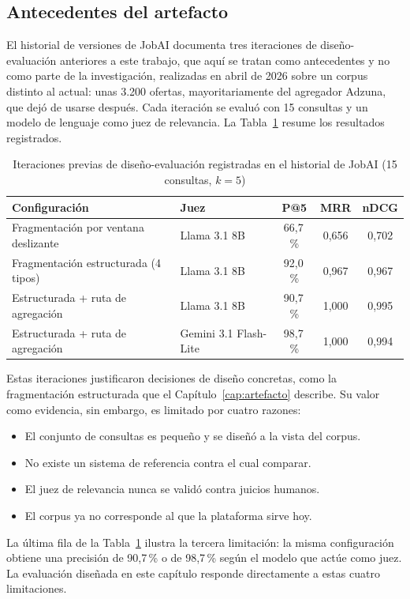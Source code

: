 \subsection{Antecedentes del artefacto}
\label{sec:met-ciclos-previos}

El historial de versiones de JobAI documenta tres iteraciones de diseño-evaluación anteriores a este trabajo, que aquí se tratan como antecedentes y no como parte de la investigación, realizadas en abril de 2026 sobre un corpus distinto al actual: unas 3.200 ofertas, mayoritariamente del agregador Adzuna, que dejó de usarse después. Cada iteración se evaluó con 15 consultas y un modelo de lenguaje como juez de relevancia. La Tabla~\ref{tab:met-iteraciones} resume los resultados registrados.

\begin{table}[htbp!]
    \centering
    \caption{Iteraciones previas de diseño-evaluación registradas en el historial de JobAI (15 consultas, $k=5$)}
    \label{tab:met-iteraciones}
    \begin{tabular}{|p{6.2cm}|p{2.6cm}|c|c|c|}
        \hline
        \textbf{Configuración} & \textbf{Juez} & \textbf{P@5} & \textbf{MRR} & \textbf{nDCG} \\
        \hline
        Fragmentación por ventana deslizante & Llama 3.1 8B & 66,7\,\% & 0,656 & 0,702 \\
        \hline
        Fragmentación estructurada (4 tipos) & Llama 3.1 8B & 92,0\,\% & 0,967 & 0,967 \\
        \hline
        Estructurada + ruta de agregación & Llama 3.1 8B & 90,7\,\% & 1,000 & 0,995 \\
        \hline
        Estructurada + ruta de agregación & Gemini 3.1 Flash-Lite & 98,7\,\% & 1,000 & 0,994 \\
        \hline
    \end{tabular}
\end{table}

Estas iteraciones justificaron decisiones de diseño concretas, como la fragmentación estructurada que el Capítulo~\ref{cap:artefacto} describe. Su valor como evidencia, sin embargo, es limitado por cuatro razones:
\begin{itemize}
    \item El conjunto de consultas es pequeño y se diseñó a la vista del corpus.
    \item No existe un sistema de referencia contra el cual comparar.
    \item El juez de relevancia nunca se validó contra juicios humanos.
    \item El corpus ya no corresponde al que la plataforma sirve hoy.
\end{itemize}
La última fila de la Tabla~\ref{tab:met-iteraciones} ilustra la tercera limitación: la misma configuración obtiene una precisión de 90,7\,\% o de 98,7\,\% según el modelo que actúe como juez. La evaluación diseñada en este capítulo responde directamente a estas cuatro limitaciones.


